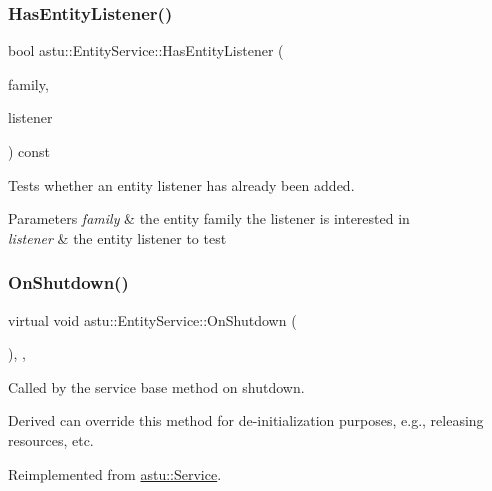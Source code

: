 \subsubsection{\texorpdfstring{Has\+Entity\+Listener()}{HasEntityListener()}}
{\footnotesize\ttfamily bool astu\+::\+Entity\+Service\+::\+Has\+Entity\+Listener (\begin{DoxyParamCaption}\item[{const \hyperlink{classastu_1_1EntityFamily}{Entity\+Family} \&}]{family,  }\item[{\hyperlink{classastu_1_1IEntityListener}{I\+Entity\+Listener} \&}]{listener }\end{DoxyParamCaption}) const}

Tests whether an entity listener has already been added.


\begin{DoxyParams}{Parameters}
{\em family} & the entity family the listener is interested in \\
\hline
{\em listener} & the entity listener to test \\
\hline
\end{DoxyParams}
\mbox{\label{classastu_1_1EntityService_ac998c4d02a90460a129c8f2e0586d728}} 
\subsubsection{\texorpdfstring{On\+Shutdown()}{OnShutdown()}}
{\footnotesize\ttfamily virtual void astu\+::\+Entity\+Service\+::\+On\+Shutdown (\begin{DoxyParamCaption}{ }\end{DoxyParamCaption})\hspace{0.3cm}{\ttfamily [override]}, {\ttfamily [protected]}, {\ttfamily [virtual]}}

Called by the service base method on shutdown.

Derived can override this method for de-\/initialization purposes, e.\+g., releasing resources, etc. 

Reimplemented from \hyperlink{classastu_1_1Service_a1e1dff727df791c57fae782d8a613c5f}{astu\+::\+Service}.

\mbox{\label{classastu_1_1EntityService_a293ff7c8b84837b08cdabe98ed8a23ea}} 
